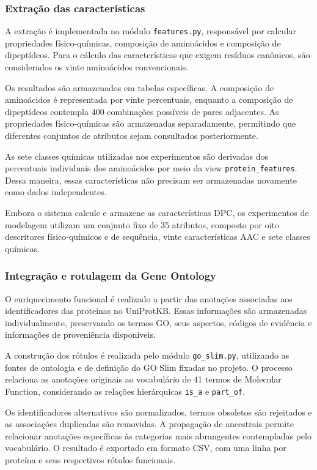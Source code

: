 \subsubsection{Extração das características}

A extração é implementada no módulo \texttt{features.py}, responsável por calcular propriedades físico-químicas, composição de aminoácidos e composição de dipeptídeos. Para o cálculo das características que exigem resíduos canônicos, são considerados os vinte aminoácidos convencionais.

Os resultados são armazenados em tabelas específicas. A composição de aminoácidos é representada por vinte percentuais, enquanto a composição de dipeptídeos contempla 400 combinações possíveis de pares adjacentes. As propriedades físico-químicas são armazenadas separadamente, permitindo que diferentes conjuntos de atributos sejam consultados posteriormente.

As sete classes químicas utilizadas nos experimentos são derivadas dos percentuais individuais dos aminoácidos por meio da view \texttt{protein\_features}. Dessa maneira, essas características não precisam ser armazenadas novamente como dados independentes.

Embora o sistema calcule e armazene as características DPC, os experimentos de modelagem utilizam um conjunto fixo de 35 atributos, composto por oito descritores físico-químicos e de sequência, vinte características AAC e sete classes químicas.

\subsubsection{Integração e rotulagem da Gene Ontology}

O enriquecimento funcional é realizado a partir das anotações associadas aos identificadores das proteínas no UniProtKB. Essas informações são armazenadas individualmente, preservando os termos GO, seus aspectos, códigos de evidência e informações de proveniência disponíveis.

A construção dos rótulos é realizada pelo módulo \texttt{go\_slim.py}, utilizando as fontes de ontologia e de definição do GO Slim fixadas no projeto. O processo relaciona as anotações originais ao vocabulário de 41 termos de Molecular Function, considerando as relações hierárquicas \texttt{is\_a} e \texttt{part\_of}.

Os identificadores alternativos são normalizados, termos obsoletos são rejeitados e as associações duplicadas são removidas. A propagação de ancestrais permite relacionar anotações específicas às categorias mais abrangentes contempladas pelo vocabulário. O resultado é exportado em formato CSV, com uma linha por proteína e seus respectivos rótulos funcionais.

